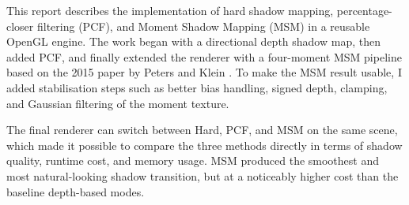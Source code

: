 This report describes the implementation of hard shadow mapping, percentage-closer filtering (PCF), and Moment Shadow Mapping (MSM) in a reusable OpenGL engine. The work began with a directional depth shadow map, then added PCF, and finally extended the renderer with a four-moment MSM pipeline based on the 2015 paper by Peters and Klein \cite{peters2015msm}. To make the MSM result usable, I added stabilisation steps such as better bias handling, signed depth, clamping, and Gaussian filtering of the moment texture.

The final renderer can switch between Hard, PCF, and MSM on the same scene, which made it possible to compare the three methods directly in terms of shadow quality, runtime cost, and memory usage. MSM produced the smoothest and most natural-looking shadow transition, but at a noticeably higher cost than the baseline depth-based modes.
